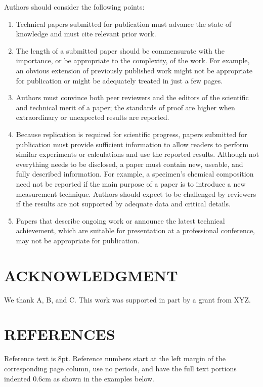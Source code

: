 \documentclass{IEEEojcsys}
\begin{document}
Authors should consider the following points:
\begin{enumerate}
\item[1)]Technical papers submitted for publication must advance the state of knowledge and must cite relevant prior work. 

\item[2)]The length of a submitted paper should be commensurate with the importance, or be appropriate to the complexity, of the work. For example, an obvious extension of previously published work might not be appropriate for publication or might be adequately treated in just a few pages.

\item[3)]Authors must convince both peer reviewers and the editors of the scientific and technical merit of a paper; the standards of proof are higher when extraordinary or unexpected results are reported. 

\item[4)]Because replication is required for scientific progress, papers submitted for publication must provide sufficient information to allow readers to perform similar experiments or calculations and use the reported results. Although not everything needs to be disclosed, a paper must contain new, useable, and fully described information. For example, a specimen's chemical composition need not be reported if the main purpose of a paper is to introduce a new measurement technique. Authors should expect to be challenged by reviewers if the results are not supported by adequate data and critical details.

\item[5)]Papers that describe ongoing work or announce the latest technical achievement, which are suitable for presentation at a professional conference, may not be appropriate for publication.
\end{enumerate}\vspace*{5pt}

\section*{ACKNOWLEDGMENT}
We  thank  A,  B,  and  C.  This  work  was  supported  in  part  by  a grant from XYZ.


\section*{REFERENCES}
Reference text is 8pt. Reference numbers start at the left
margin of the corresponding page column, use no periods,
and have the full text portions indented 0.6cm as shown in the examples\vadjust{\vspace*{-10pt}\pagebreak} below.
\end{document}
